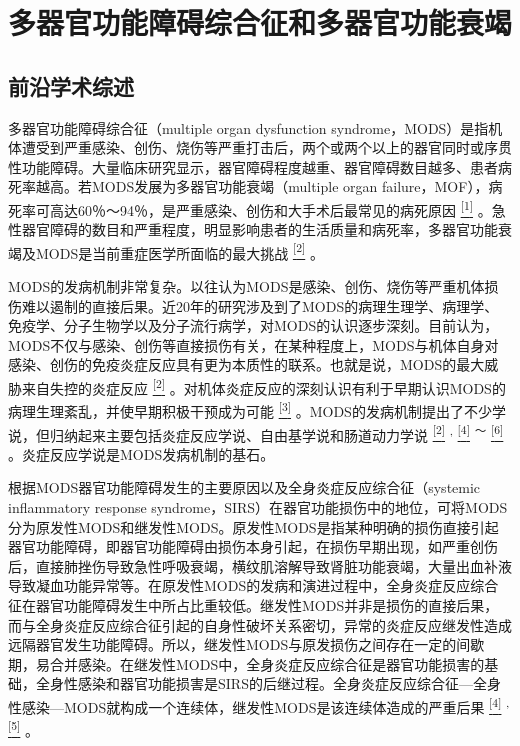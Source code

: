 \chapter{多器官功能障碍综合征和多器官功能衰竭}

\section{前沿学术综述}

多器官功能障碍综合征（multiple organ dysfunction
syndrome，MODS）是指机体遭受到严重感染、创伤、烧伤等严重打击后，两个或两个以上的器官同时或序贯性功能障碍。大量临床研究显示，器官障碍程度越重、器官障碍数目越多、患者病死率越高。若MODS发展为多器官功能衰竭（multiple
organ
failure，MOF），病死率可高达60％～94％，是严重感染、创伤和大手术后最常见的病死原因
\protect\hyperlink{text00007.htmlux5cux23ch1-6}{\textsuperscript{{[}1{]}}}
。急性器官障碍的数目和严重程度，明显影响患者的生活质量和病死率，多器官功能衰竭及MODS是当前重症医学所面临的最大挑战
\protect\hyperlink{text00007.htmlux5cux23ch2-6}{\textsuperscript{{[}2{]}}}
。

MODS的发病机制非常复杂。以往认为MODS是感染、创伤、烧伤等严重机体损伤难以遏制的直接后果。近20年的研究涉及到了MODS的病理生理学、病理学、免疫学、分子生物学以及分子流行病学，对MODS的认识逐步深刻。目前认为，MODS不仅与感染、创伤等直接损伤有关，在某种程度上，MODS与机体自身对感染、创伤的免疫炎症反应具有更为本质性的联系。也就是说，MODS的最大威胁来自失控的炎症反应
\protect\hyperlink{text00007.htmlux5cux23ch2-6}{\textsuperscript{{[}2{]}}}
。对机体炎症反应的深刻认识有利于早期认识MODS的病理生理紊乱，并使早期积极干预成为可能
\protect\hyperlink{text00007.htmlux5cux23ch3-6}{\textsuperscript{{[}3{]}}}
。MODS的发病机制提出了不少学说，但归纳起来主要包括炎症反应学说、自由基学说和肠道动力学说
\protect\hyperlink{text00007.htmlux5cux23ch2-6}{\textsuperscript{{[}2{]}}}
\textsuperscript{,}
\protect\hyperlink{text00007.htmlux5cux23ch4-6}{\textsuperscript{{[}4{]}}}
\textsuperscript{～}
\protect\hyperlink{text00007.htmlux5cux23ch6-6}{\textsuperscript{{[}6{]}}}
。炎症反应学说是MODS发病机制的基石。

根据MODS器官功能障碍发生的主要原因以及全身炎症反应综合征（systemic
inflammatory response
syndrome，SIRS）在器官功能损伤中的地位，可将MODS分为原发性MODS和继发性MODS。原发性MODS是指某种明确的损伤直接引起器官功能障碍，即器官功能障碍由损伤本身引起，在损伤早期出现，如严重创伤后，直接肺挫伤导致急性呼吸衰竭，横纹肌溶解导致肾脏功能衰竭，大量出血补液导致凝血功能异常等。在原发性MODS的发病和演进过程中，全身炎症反应综合征在器官功能障碍发生中所占比重较低。继发性MODS并非是损伤的直接后果，而与全身炎症反应综合征引起的自身性破坏关系密切，异常的炎症反应继发性造成远隔器官发生功能障碍。所以，继发性MODS与原发损伤之间存在一定的间歇期，易合并感染。在继发性MODS中，全身炎症反应综合征是器官功能损害的基础，全身性感染和器官功能损害是SIRS的后继过程。全身炎症反应综合征---全身性感染---MODS就构成一个连续体，继发性MODS是该连续体造成的严重后果
\protect\hyperlink{text00007.htmlux5cux23ch4-6}{\textsuperscript{{[}4{]}}}
\textsuperscript{,}
\protect\hyperlink{text00007.htmlux5cux23ch5-6}{\textsuperscript{{[}5{]}}}
。

